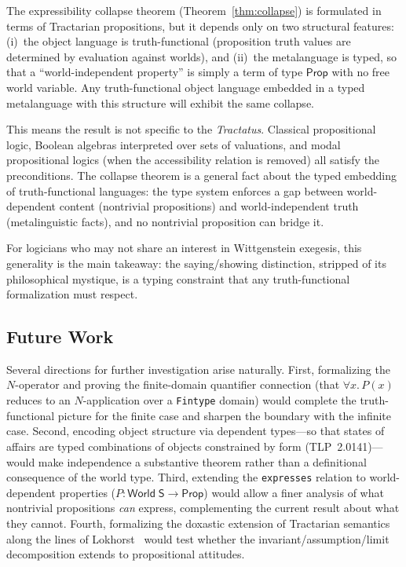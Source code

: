 \documentclass[10pt, letterpaper]{article}
\theoremstyle{definition}
\theoremstyle{remark}
\newcommand{\Sach}{\mathsf{S}}
\newcommand{\World}{\mathsf{World}}
\newcommand{\Prop}{\mathsf{Prop}}
\begin{document}
The expressibility collapse theorem
(Theorem~\ref{thm:collapse}) is formulated in terms of
Tractarian propositions, but it depends only on two structural
features: (i)~the object language is truth-functional
(proposition truth values are determined by evaluation against
worlds), and (ii)~the metalanguage is typed, so that a
``world-independent property'' is simply a term of type
$\Prop$ with no free world variable.  Any truth-functional
object language embedded in a typed metalanguage with this
structure will exhibit the same collapse.

This means the result is not specific to the
\emph{Tractatus}.  Classical propositional logic, Boolean
algebras interpreted over sets of valuations, and modal
propositional logics (when the accessibility relation is
removed) all satisfy the preconditions.  The collapse theorem
is a general fact about the typed embedding of truth-functional
languages: the type system enforces a gap between
world-dependent content (nontrivial propositions) and
world-independent truth (metalinguistic facts), and no
nontrivial proposition can bridge it.

For logicians who may not share an interest in Wittgenstein
exegesis, this generality is the main takeaway: the
saying/showing distinction, stripped of its philosophical
mystique, is a typing constraint that any truth-functional
formalization must respect.

\subsection{Future Work}
\label{sec:future}

Several directions for further investigation arise naturally.
First, formalizing the $N$-operator and proving the
finite-domain quantifier connection (that $\forall x.\, P(x)$
reduces to an $N$-application over a \texttt{Fintype} domain)
would complete the truth-functional picture for the finite
case and sharpen the boundary with the infinite case.
Second, encoding object structure via dependent types---so
that states of affairs are typed combinations of objects
constrained by form (TLP~2.0141)---would make independence
a substantive theorem rather than a definitional consequence
of the world type.
Third, extending the \texttt{expresses} relation to
world-dependent properties ($P : \World\;\Sach \to \Prop$)
would allow a finer analysis of what nontrivial propositions
\emph{can} express, complementing the current result about
what they cannot.
Fourth, formalizing the doxastic extension of Tractarian
semantics along the lines of Lokhorst~\cite{lokhorst1988}
would test whether the invariant/assumption/limit decomposition
extends to propositional attitudes.
\end{document}
